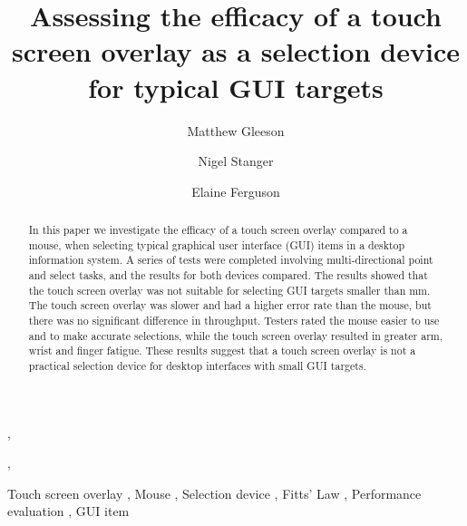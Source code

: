 \documentclass{elsart}
\begin{document}
\begin{frontmatter}



\title{Assessing the efficacy of a touch screen overlay as a selection
device for typical GUI targets}


\author[info]{Matthew Gleeson},
\author[info]{Nigel Stanger},
\author[hunt]{Elaine Ferguson}

\address[info]{Department of Information Science,}
\address[hunt]{Department of Human Nutrition, \\ University of Otago, PO Box 56, Dunedin, New Zealand}


\begin{abstract}

In this paper we investigate the efficacy of a touch screen overlay
compared to a mouse, when selecting typical graphical user interface
(GUI) items in a desktop information system. A series of tests were
completed involving multi-directional point and select tasks, and the
results for both devices compared. The results showed that the touch
screen overlay was not suitable for selecting GUI targets smaller than
\unit[4]{mm}. The touch screen overlay was slower and had a higher error
rate than the mouse, but there was no significant difference in
throughput. Testers rated the mouse easier to use and to make accurate
selections, while the touch screen overlay resulted in greater arm,
wrist and finger fatigue. These results suggest that a touch screen
overlay is not a practical selection device for desktop interfaces with
small GUI targets.

\end{abstract}

\begin{keyword}
Touch screen overlay \sep
Mouse \sep
Selection device \sep
Fitts' Law \sep
Performance evaluation \sep
GUI item
\end{keyword}

\end{frontmatter}
\end{document}
